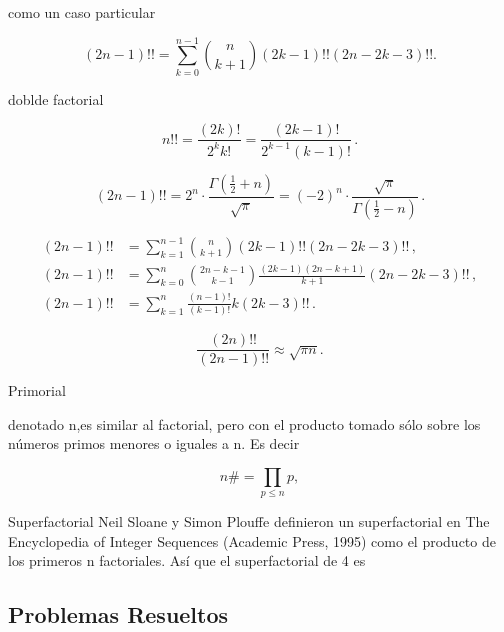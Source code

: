 como un caso particular

$${\displaystyle (2n-1)!!=\sum _{k=0}^{n-1}{\binom {n}{k+1}}(2k-1)!!(2n-2k-3)!!.}$$



doblde factorial

$$ {\displaystyle n!!={\frac {(2k)!}{2^{k}k!}}={\frac {(2k-1)!}{2^{k-1}(k-1)!}}\,.}$$

$${\displaystyle (2n-1)!!=2^{n}\cdot {\frac {\Gamma \left({\frac {1}{2}}+n\right)}{\sqrt {\pi }}}=(-2)^{n}\cdot {\frac {\sqrt {\pi }}{\Gamma \left({\frac {1}{2}}-n\right)}}\,.}$$

$${\displaystyle {\begin{aligned}(2n-1)!!&=\sum _{k=1}^{n-1}{\binom {n}{k+1}}(2k-1)!!(2n-2k-3)!!\,,\\(2n-1)!!&=\sum _{k=0}^{n}{\binom {2n-k-1}{k-1}}{\frac {(2k-1)(2n-k+1)}{k+1}}(2n-2k-3)!!\,,\\(2n-1)!!&=\sum _{k=1}^{n}{\frac {(n-1)!}{(k-1)!}}k(2k-3)!!\,.\end{aligned}}}$$

$${\displaystyle {\frac {(2n)!!}{(2n-1)!!}}\approx {\sqrt {\pi n}}.}$$


Primorial

denotado n,es similar al factorial, pero con el producto tomado sólo sobre los números primos menores o iguales a n. Es decir

$${\displaystyle n\#=\prod _{p\leq n}p,}$$

Superfactorial
Neil Sloane y Simon Plouffe definieron un superfactorial en The Encyclopedia of Integer Sequences (Academic Press, 1995) como el producto de los primeros n factoriales. Así que el superfactorial de 4 es





\subsection{Problemas Resueltos}






